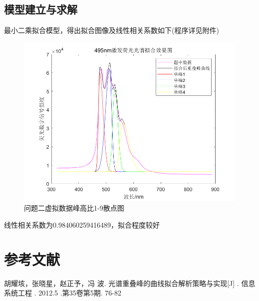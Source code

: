 \documentclass{article}
\numberwithin{equation}{subsection}
\begin{document}
\subsection{模型建立与求解}
最小二乘拟合模型，得出拟合图像及线性相关系数如下(程序详见附件)
\begin{figure}[H]
    \centering
    \includegraphics[scale=0.6]{非对称拟合.png}
    \caption{问题二虚拟数据峰高比1-9散点图}
    \label{问题二虚拟数据峰高比1-9散点图}
\end{figure}
线性相关系数为0.984060259416489，拟合程度较好

















{\centering\section{参考文献}}
\begingroup  %
\renewcommand{\section}[2]{}
\begin{thebibliography}{99}
    
胡耀垓，张晓星，赵正予，冯 波. 光谱重叠峰的曲线拟合解析策略与实现[J] . 信息系统工程 . 2012.5 .第35卷第5期. 76-82

\end{thebibliography}
\endgroup
\end{document}
